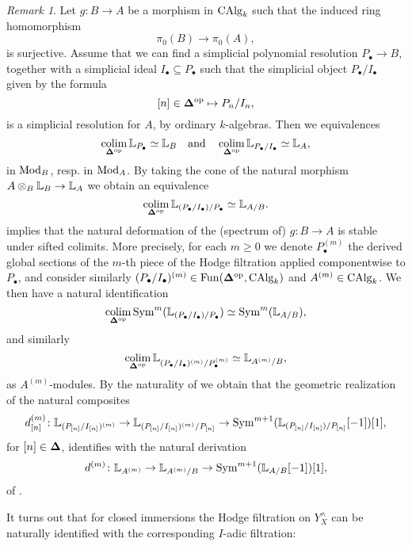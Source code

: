 \documentclass[10pt,a4paper,reqno]{amsart} %
\theoremstyle{plain}
\theoremstyle{definition}
\theoremstyle{remark}
\newtheorem{rem}[thm]{Remark}
\numberwithin{equation}{section}
\begin{document}
\begin{rem} \label{rem:sifted_colimits_and_Hodge_filtration}
    Let $g \colon  B \to A$ be a morphism in $\mathrm{CAlg}_k$ such that the induced ring homomorphism
        \[
            \pi_0(B) \to \pi_0(A),  
        \]
    is surjective. Assume that we can find a simplicial polynomial resolution $P_\bullet \to B$, together with a simplicial ideal
    $I_\bullet \subseteq P_\bullet$ such that the simplicial object $P_\bullet / I_\bullet$ given by the formula
        \[
            [n] \in \bm{\Delta} ^\mathrm{op} \mapsto P_n/I_n,  
        \]
    is a simplicial resolution for $A$, by ordinary $k$-algebras. Then we equivalences
        \[
            \operatorname*{colim}_{\bm{\Delta} ^\mathrm{op}} \mathbb L_{P_\bullet} \simeq \mathbb L_B \quad \mathrm{and} \quad \operatorname*{colim}_{\bm{\Delta} ^\mathrm{op}} \mathbb L_{P_\bullet / I_\bullet} \simeq \mathbb L_A,  
        \]
    in $\mathrm{Mod}_B$, resp. in $\mathrm{Mod}_A$. By taking the cone of the natural morphism $A \otimes_B \mathbb L_B \to \mathbb L_A$ we obtain an equivalence
        \[
            \operatorname*{colim}_{\bm{\Delta} ^\mathrm{op}} \mathbb L_{(P_\bullet/ I_\bullet)/ P_\bullet} \simeq \mathbb L_{A/ B}.  
        \]
    \cite[\S 9, Proposition 5.1.3]{Gaitsgory_Study_II} implies that the natural deformation of the (spectrum of) $g \colon B \to A$ is stable
    under sifted colimits. More precisely, for each $m \ge 0$ we denote $P_\bullet^{(m)}$ the derived global sections of the $m$-th piece of the Hodge filtration applied componentwise to $P_\bullet$, and
    consider similarly $(P_\bullet/ I_\bullet)^{(m)} \in \operatorname{Fun}(\bm{\Delta} ^\mathrm{op}, \mathrm{CAlg}_k)$ and $A^{(m)} \in \mathrm{CAlg}_k$.
    We then have a natural identification
        \[
            \operatorname*{colim}_{\bm{\Delta} ^\mathrm{op}} \operatorname{Sym}^{m}(\mathbb L_{(P_\bullet/ I_\bullet)/ P_\bullet}) \simeq \operatorname{Sym}^{m}(\mathbb L_{A/ B}),
        \] 
    and similarly
        \[
            \operatorname*{colim}_{\bm{\Delta} ^\mathrm{op}} \mathbb L_{(P_\bullet/ I_\bullet)^{(m)}/ P_\bullet^{(m)}} \simeq \mathbb L_{A^{(m)}/ B},  
        \]
    as $A^{(m)}$-modules. By the naturality of \cite[\S 9, Proposition 5.1.3]{Gaitsgory_Study_II} we obtain that the geometric realization of
    the natural composites
        \[
            d^{(m)}_{[n]} \colon \mathbb L_{(P_{[n]}/ I_{[n]})^{(m)}}  \to \mathbb L_{(P_{[n]} / I_{[n]})^{(m)}/ P_{[n]}} \to \operatorname{Sym}^{m+1}(\mathbb L_{(P_{[n]}/ I_{[n]})/ P_{[n]}}[-1])[1],
        \]
    for $[n] \in \bm{\Delta}$, identifies with the natural derivation
        \[
            d^{(m)} \colon \mathbb L_{A^{(m)}} \to \mathbb L_{A^{(m)}/ B} \to \operatorname{Sym}^{m+1}(\mathbb L_{A/ B}[-1])[1],
        \]
    of \cite[\S 9.5.1]{Gaitsgory_Study_II}.
\end{rem}

It turns out that for closed immersions the Hodge filtration on $Y^\wedge_X$ can be naturally identified with the corresponding $I$-adic
filtration:
\end{document}
